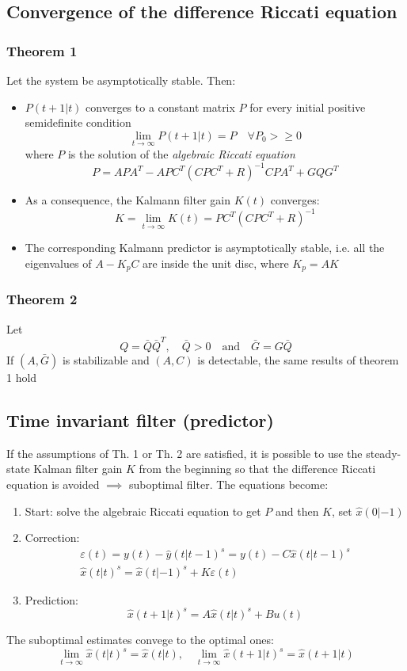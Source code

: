 \documentclass{book}
\theoremstyle{definition}
\theoremstyle{remark}
\theoremstyle{remark}
\begin{document}
\subsection{Convergence of the difference Riccati equation}
\subsubsection{Theorem 1}
Let the system be asymptotically stable. Then: 
\begin{itemize}
    \item $P(t+1|t)$ converges to a constant matrix $P$ for every initial positive semidefinite condition 
        \[
            \lim_{t\to\infty}P(t+1|t)=P \quad \forall P_0>\geq0
        \]
        where $P$ is the solution of the \emph{algebraic Riccati equation} 
        \[
            P=APA^T-APC^T(CPC^T+R)^{-1}CPA^T+GQG^T
        \]
    \item As a consequence, the Kalmann filter gain $K(t)$ converges: 
        \[
            K=\lim_{t\to\infty}K(t)=PC^T(CPC^T+R)^{-1}
        \]
    \item The corresponding Kalmann predictor is asymptotically stable, i.e. all the eigenvalues of $A-K_pC$ are inside the unit disc, where $K_p=AK$
\end{itemize}
\subsubsection{Theorem 2}
Let 
\[
    Q=\bar{Q}\bar{Q}^T, \quad \bar{Q}>0 \quad \text{and} \quad \bar{G}=G\bar{Q}
\]
If $(A,\bar{G})$ is stabilizable and $(A,C)$ is detectable, the same results of theorem 1 hold

\subsection{Time invariant filter (predictor)}
If the assumptions of Th. 1 or Th. 2 are satisfied, it is possible to use the steady-state Kalman filter gain $K$ from the beginning so that the difference Riccati equation is avoided $\implies$ suboptimal filter. The equations become: 
\begin{enumerate}
    \item Start: solve the algebraic Riccati equation to get $P$ and then $K$, set $\hat{x}(0|-1)$
        \item Correction: \begin{gather}
                \varepsilon(t)=y(t)-\hat{y}(t|t-1)^s=y(t)-C\hat{x}(t|t-1)^s \tag{1}\\
                \hat{x}(t|t)^s=\hat{x}(t|-1)^s+K\varepsilon(t) \tag{2}
        \end{gather}
        \item Prediction: 
            \[
                \hat{x}(t+1|t)^s=A\hat{x}(t|t)^s+Bu(t) \tag{3}
            \]
\end{enumerate}
The suboptimal estimates convege to the optimal ones: 
\[
    \lim_{t\to\infty}\hat{x}(t|t)^s=\hat{x}(t|t), \quad \lim_{t\to\infty}\hat{x}(t+1|t)^s=\hat{x}(t+1|t)
\]
\end{document}
